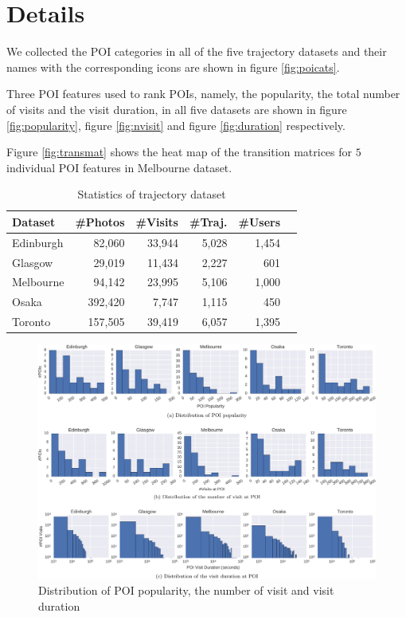 \appendix
\section{Details}
We collected the POI categories in all of the five trajectory datasets
and their names with the corresponding icons are shown in figure \ref{fig:poicats}.

Three POI features used to rank POIs, namely, the popularity,
the total number of visits and the visit duration, in all five datasets are shown in
figure \ref{fig:popularity}, figure \ref{fig:nvisit} and figure \ref{fig:duration} respectively.

Figure \ref{fig:transmat} shows the heat map of the transition matrices for $5$ individual POI features
in Melbourne dataset.

\begin{table}
\caption{Statistics of trajectory dataset}
\label{tab:data}
\centering\small
\begin{tabular}{lrrrrr} \hline
\textbf{Dataset} & \textbf{\#Photos} & \textbf{\#Visits} & \textbf{\#Traj.} & \textbf{\#Users} \\ \hline
Edinburgh & 82,060 & 33,944 & 5,028 & 1,454 \\
Glasgow & 29,019 & 11,434 & 2,227 & 601 \\
Melbourne & 94,142 & 23,995 & 5,106 & 1,000 \\
Osaka & 392,420 & 7,747 & 1,115 & 450 \\
Toronto & 157,505 & 39,419 & 6,057 & 1,395 \\
\hline
\end{tabular}
\end{table}



\begin{figure}[t]
\includegraphics[width=\textwidth]{fig/feature_distro.pdf}
\caption{Distribution of POI popularity, the number of visit and visit duration}
\label{fig:distro}
\end{figure}

